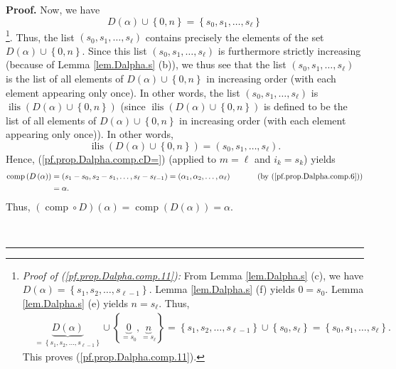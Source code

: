 \documentclass[numbers=enddot,12pt,final,onecolumn,notitlepage,abstracton]{scrartcl}
\theoremstyle{definition}
\newenvironment{proof}[1][Proof]{\noindent\textbf{#1.} }{\ \rule{0.5em}{0.5em}}
\newenvironment{verlong}{}{}
\begin{document}
\begin{verlong}
\begin{footnotesize}
\begin{proof}
Now, we have%
\begin{equation}
D\left(  \alpha\right)  \cup\left\{  0,n\right\}  =\left\{  s_{0},s_{1}%
,\ldots,s_{\ell}\right\}  \label{pf.prop.Dalpha.comp.11}%
\end{equation}
\footnote{\textit{Proof of (\ref{pf.prop.Dalpha.comp.11}):} From Lemma
\ref{lem.Dalpha.s} (c), we have $D\left(  \alpha\right)  =\left\{  s_{1}%
,s_{2},\ldots,s_{\ell-1}\right\}  $. Lemma \ref{lem.Dalpha.s} (f) yields $0 =
s_{0}$. Lemma \ref{lem.Dalpha.s} (e) yields $n = s_{\ell}$. Thus,%
\begin{align*}
&  \underbrace{D\left(  \alpha\right)  }_{=\left\{  s_{1},s_{2},\ldots
,s_{\ell-1}\right\}  }\cup\left\{  \underbrace{0}_{=s_{0}}, \underbrace{n}%
_{=s_{\ell}}\right\}  =\left\{  s_{1},s_{2},\ldots,s_{\ell-1}\right\}
\cup\left\{  s_{0},s_{\ell}\right\}  =\left\{  s_{0},s_{1},\ldots,s_{\ell
}\right\}  .
\end{align*}
This proves (\ref{pf.prop.Dalpha.comp.11}).}. Thus, the list $\left(
s_{0},s_{1},\ldots,s_{\ell}\right)  $ contains precisely the elements of the
set $D\left(  \alpha\right)  \cup\left\{  0,n\right\}  $. Since this list
$\left(  s_{0},s_{1},\ldots,s_{\ell}\right)  $ is furthermore strictly
increasing (because of Lemma \ref{lem.Dalpha.s} (b)), we thus see that the
list $\left(  s_{0},s_{1},\ldots,s_{\ell}\right)  $ is the list of all
elements of $D\left(  \alpha\right)  \cup\left\{  0,n\right\}  $ in increasing
order (with each element appearing only once). In other words, the list
$\left(  s_{0},s_{1},\ldots,s_{\ell}\right)  $ is $\operatorname*{ilis}\left(
D\left(  \alpha\right)  \cup\left\{  0,n\right\}  \right)  $ (since
$\operatorname*{ilis}\left(  D\left(  \alpha\right)  \cup\left\{  0,n\right\}
\right)  $ is defined to be the list of all elements of $D\left(
\alpha\right)  \cup\left\{  0,n\right\}  $ in increasing order (with each
element appearing only once)). In other words,%
\[
\operatorname*{ilis}\left(  D\left(  \alpha\right)  \cup\left\{  0,n\right\}
\right)  =\left(  s_{0},s_{1},\ldots,s_{\ell}\right)  .
\]
Hence, (\ref{pf.prop.Dalpha.comp.cD=}) (applied to $m=\ell$ and $i_{k}=s_{k}$)
yields%
\begin{align*}
\operatorname*{comp}\left(  D\left(  \alpha\right)  \right)   &  =\left(
s_{1}-s_{0},s_{2}-s_{1},\ldots,s_{\ell}-s_{\ell-1}\right)  =\left(  \alpha
_{1},\alpha_{2},\ldots,\alpha_{\ell}\right)  \ \ \ \ \ \ \ \ \ \ \left(
\text{by (\ref{pf.prop.Dalpha.comp.6})}\right) \\
&  =\alpha.
\end{align*}
Thus, $\left(  \operatorname*{comp}\circ D\right)  \left(  \alpha\right)
=\operatorname*{comp}\left(  D\left(  \alpha\right)  \right)  =\alpha$.


\end{proof}
\end{footnotesize}
\end{verlong}
\end{document}

